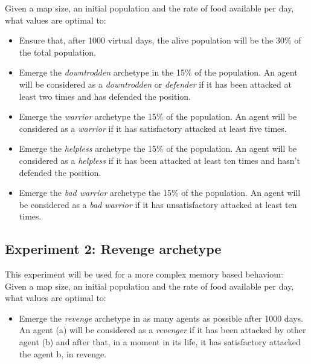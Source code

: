 \documentclass[runningheads]{llncs}
\begin{document}
Given a map size, an initial population and the rate of food available per day, what values are optimal to:
\begin{itemize}
\item Ensure that, after 1000 virtual days, the alive population will be the 30\% of the total population.
\item Emerge the \textit{downtrodden} archetype in the 15\% of the
  population. An agent will be considered as a \textit{downtrodden} or
  \textit{defender} if it has been attacked at least two times and has
  defended the position. 
\item Emerge the \textit{warrior} archetype the 15\% of the population. An agent will be considered as a \textit{warrior} if it has satisfactory attacked at least five times. 
\item Emerge the \textit{helpless} archetype the 15\% of the population. An agent will be considered as a \textit{helpless}  if it has been attacked at least ten times and hasn't defended the position.
\item Emerge the \textit{bad warrior} archetype the 15\% of the population. An agent will be considered as a \textit{bad warrior}  if it has unsatisfactory attacked at least ten times.
\end{itemize}


\subsection{Experiment 2: Revenge archetype}
\label{sec:setup_exp2}

This experiment will be used for a more complex memory based behaviour:\\

Given a map size, an initial population and the rate of food available per day, what values are optimal to:
\begin{itemize}
\item Emerge the \textit{revenge} archetype in as many agents as possible after 1000 days.  An agent (a) will be considered as a \textit{revenger} if it has been attacked by other agent (b) and after that, in a moment in its life, it has satisfactory attacked the agent b, in revenge.
\end{itemize}

\end{document}
